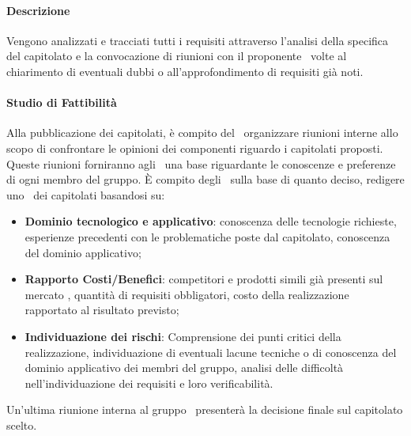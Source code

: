 \documentclass[../NormeDiProgetto.tex]{subfiles}
\begin{document}
			\paragraph{Descrizione\\}
				Vengono analizzati e tracciati tutti i requisiti attraverso l'analisi della
				specifica del capitolato e la convocazione di riunioni con il proponente
				\proponente\ volte al chiarimento di eventuali dubbi o all'approfondimento di
				requisiti già noti.
			\paragraph{Studio di Fattibilità\\}
				Alla pubblicazione dei capitolati, è compito del \responsabilediprogetto\ organizzare riunioni interne allo scopo di confrontare le opinioni dei componenti riguardo i capitolati proposti. Queste riunioni forniranno agli \analisti\ una base riguardante
				le conoscenze e preferenze di ogni membro del gruppo. È compito degli \analisti\, sulla
				base di quanto deciso, redigere uno \studiodifattibilita\ dei capitolati basandosi su:
				\begin{itemize}
					\item \textbf{Dominio tecnologico e applicativo}: conoscenza delle tecnologie richieste,
					esperienze precedenti con le problematiche poste dal capitolato, conoscenza del
					dominio applicativo;
					\item \textbf{Rapporto Costi/Benefici}: competitori e prodotti simili già presenti sul mercato
					, quantità di requisiti obbligatori, costo della realizzazione rapportato al
					risultato previsto;
					\item \textbf{Individuazione dei rischi}: Comprensione dei punti critici della realizzazione,
					individuazione di eventuali lacune tecniche o di conoscenza del dominio applicativo
					dei membri del gruppo, analisi delle difficoltà nell’individuazione dei requisiti e loro
					verificabilità.
				\end{itemize}
				Un’ultima riunione interna al gruppo \kaleidoscode\ presenterà la decisione finale sul
				capitolato scelto.
				
\end{document}
